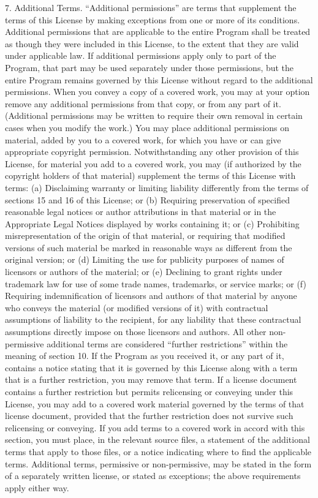 \documentclass {scrbook}
\begin{document}
\begin{tiny}
7. Additional Terms. ``Additional permissions'' are terms that supplement the terms of this License by making exceptions from one or more of its conditions. Additional permissions that are applicable to the entire Program shall be treated as though they were included in this License, to the extent that they are valid under applicable law. If additional permissions apply only to part of the Program, that part may be used separately under those permissions, but the entire Program remains governed by this License without regard to the additional permissions. When you convey a copy of a covered work, you may at your option remove any additional permissions from that copy, or from any part of it. (Additional permissions may be written to require their own removal in certain cases when you modify the work.) You may place additional permissions on material, added by you to a covered work, for which you have or can give appropriate copyright permission. Notwithstanding any other provision of this License, for material you add to a covered work, you may (if authorized by the copyright holders of that material) supplement the terms of this License with terms: (a) Disclaiming warranty or limiting liability differently from the terms of sections 15 and 16 of this License; or (b) Requiring preservation of specified reasonable legal notices or author attributions in that material or in the Appropriate Legal Notices displayed by works containing it; or (c) Prohibiting misrepresentation of the origin of that material, or requiring that modified versions of such material be marked in reasonable ways as different from the original version; or (d) Limiting the use for publicity purposes of names of licensors or authors of the material; or (e) Declining to grant rights under trademark law for use of some trade names, trademarks, or service marks; or (f) Requiring indemnification of licensors and authors of that material by anyone who conveys the material (or modified versions of it) with contractual assumptions of liability to the recipient, for any liability that these contractual assumptions directly impose on those licensors and authors. All other non-permissive additional terms are considered ``further restrictions'' within the meaning of section 10. If the Program as you received it, or any part of it, contains a notice stating that it is governed by this License along with a term that is a further restriction, you may remove that term. If a license document contains a further restriction but permits relicensing or conveying under this License, you may add to a covered work material governed by the terms of that license document, provided that the further restriction does not survive such relicensing or conveying. If you add terms to a covered work in accord with this section, you must place, in the relevant source files, a statement of the additional terms that apply to those files, or a notice indicating where to find the applicable terms. Additional terms, permissive or non-permissive, may be stated in the form of a separately written license, or stated as exceptions; the above requirements apply either way.


\end{tiny}
\end{document}
